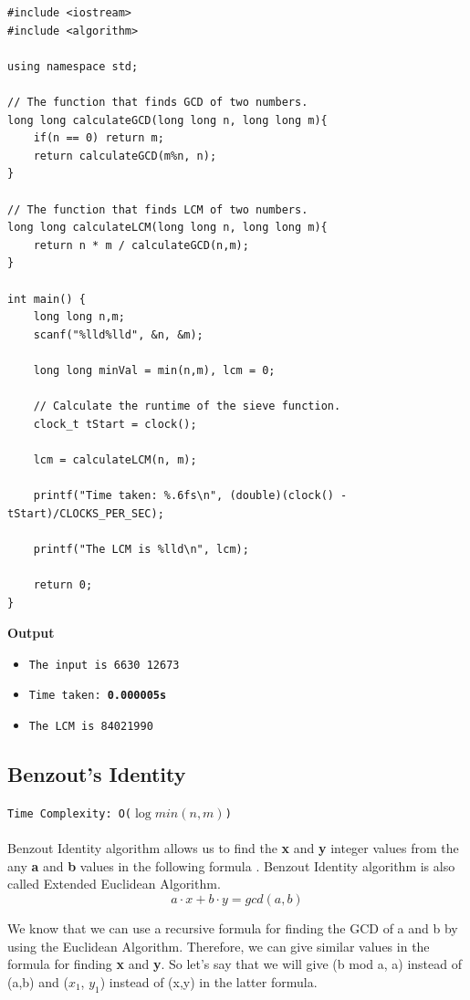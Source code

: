 \documentclass[12pt]{article}
\begin{document}
\begin{verbatim}
#include <iostream>
#include <algorithm>

using namespace std;

// The function that finds GCD of two numbers.
long long calculateGCD(long long n, long long m){
    if(n == 0) return m;
    return calculateGCD(m%n, n);
}

// The function that finds LCM of two numbers.
long long calculateLCM(long long n, long long m){
    return n * m / calculateGCD(n,m);
}

int main() {
    long long n,m;
    scanf("%lld%lld", &n, &m);
    
    long long minVal = min(n,m), lcm = 0;
    
    // Calculate the runtime of the sieve function.
    clock_t tStart = clock();
    
    lcm = calculateLCM(n, m);
    
    printf("Time taken: %.6fs\n", (double)(clock() - tStart)/CLOCKS_PER_SEC);
    
    printf("The LCM is %lld\n", lcm);
    
    return 0;
}
\end{verbatim}
\textbf{Output}

\begin{itemize}
  \item \texttt{The input is 6630 12673} 
  \item \texttt{Time taken: \textbf{0.000005s}} 
  \item \texttt{The LCM is 84021990}
\end{itemize}

\clearpage

\subsection{Benzout's Identity}
\texttt{Time Complexity: O($\log{min(n,m)}$) } \\ \\
Benzout Identity algorithm allows us to find the \textbf{x} and \textbf{y} integer values from the any \textbf{a} and \textbf{b} values in the following formula \cite{benzoutalgorithm}. Benzout Identity algorithm is also called Extended Euclidean Algorithm.
\[ a \cdot x + b \cdot y = gcd(a,b) \]

We know that we can use a recursive formula for finding the GCD of a and b by using the Euclidean Algorithm. Therefore, we can give similar values in the formula for finding \textbf{x} and \textbf{y}. So let's say that we will give (b mod a, a) instead of (a,b) and ($x_1$, $y_1$) instead of (x,y) in the latter formula.
\end{document}
